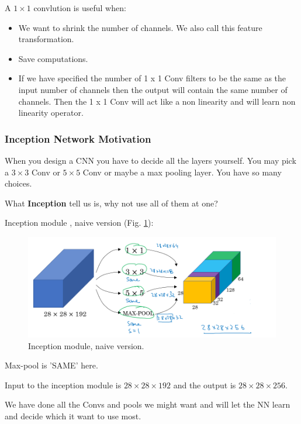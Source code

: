 A $1\times 1$ convlution is useful when: 
\begin{itemize}
    \item We want to shrink the number of channels. We also call this feature transformation.
    \item Save computations.
    \item If we have specified the number of 1 x 1 Conv filters to be the same as the input number of channels then the output will contain the same number of channels. Then the 1 x 1 Conv will act like a non linearity and will learn non linearity operator.
\end{itemize}

\subsubsection{Inception Network Motivation}
When you design a CNN you have to decide all the layers yourself. You may pick a $3\times 3$ Conv or $5\times 5$ Conv or maybe a max pooling layer. You have so many choices.

What \textbf{Inception} tell us is, why not use all of them at one?

Inception module \cite{szegedy2015going}, naive version (Fig. \ref{inception-naive}):

\begin{figure}[!htbp]
    \centering
    \includegraphics[width=1.0\textwidth]{img/c4/inception-naive.png}
    \caption{Inception module, naive version.}
    \label{inception-naive}
\end{figure}

Max-pool is 'SAME' here.

Input to the inception module is $28\times 28\times 192$ and the output is $28\times 28\times 256$.

We have done all the Convs and pools we might want and will let the NN learn and decide which it want to use most.



